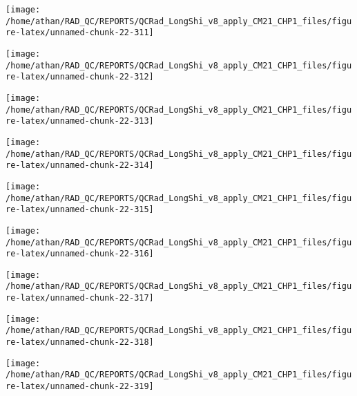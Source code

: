 \documentclass[
  10pt,
  a4paper,oneside]{article}
\begin{document}
\begin{center}\texttt{[image: /home/athan/RAD\_QC/REPORTS/QCRad\_LongShi\_v8\_apply\_CM21\_CHP1\_files/figure-latex/unnamed-chunk-22-311]} \end{center}

\begin{center}\texttt{[image: /home/athan/RAD\_QC/REPORTS/QCRad\_LongShi\_v8\_apply\_CM21\_CHP1\_files/figure-latex/unnamed-chunk-22-312]} \end{center}

\begin{center}\texttt{[image: /home/athan/RAD\_QC/REPORTS/QCRad\_LongShi\_v8\_apply\_CM21\_CHP1\_files/figure-latex/unnamed-chunk-22-313]} \end{center}

\begin{center}\texttt{[image: /home/athan/RAD\_QC/REPORTS/QCRad\_LongShi\_v8\_apply\_CM21\_CHP1\_files/figure-latex/unnamed-chunk-22-314]} \end{center}

\begin{center}\texttt{[image: /home/athan/RAD\_QC/REPORTS/QCRad\_LongShi\_v8\_apply\_CM21\_CHP1\_files/figure-latex/unnamed-chunk-22-315]} \end{center}

\begin{center}\texttt{[image: /home/athan/RAD\_QC/REPORTS/QCRad\_LongShi\_v8\_apply\_CM21\_CHP1\_files/figure-latex/unnamed-chunk-22-316]} \end{center}

\begin{center}\texttt{[image: /home/athan/RAD\_QC/REPORTS/QCRad\_LongShi\_v8\_apply\_CM21\_CHP1\_files/figure-latex/unnamed-chunk-22-317]} \end{center}

\begin{center}\texttt{[image: /home/athan/RAD\_QC/REPORTS/QCRad\_LongShi\_v8\_apply\_CM21\_CHP1\_files/figure-latex/unnamed-chunk-22-318]} \end{center}

\begin{center}\texttt{[image: /home/athan/RAD\_QC/REPORTS/QCRad\_LongShi\_v8\_apply\_CM21\_CHP1\_files/figure-latex/unnamed-chunk-22-319]} \end{center}
\end{document}
